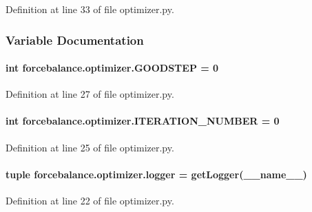 Definition at line 33 of file optimizer.\-py.



\subsubsection{Variable Documentation}
\hypertarget{namespaceforcebalance_1_1optimizer_a7b0cf561a0ec911ee4b217cb0b05a28e}{
\paragraph[{G\-O\-O\-D\-S\-T\-E\-P}]{\setlength{\rightskip}{0pt plus 5cm}int forcebalance.\-optimizer.\-G\-O\-O\-D\-S\-T\-E\-P = 0}}\label{namespaceforcebalance_1_1optimizer_a7b0cf561a0ec911ee4b217cb0b05a28e}


Definition at line 27 of file optimizer.\-py.

\hypertarget{namespaceforcebalance_1_1optimizer_ac3e728fa9f2dacdcca7e1b51d9f2a49e}{
\paragraph[{I\-T\-E\-R\-A\-T\-I\-O\-N\-\_\-\-N\-U\-M\-B\-E\-R}]{\setlength{\rightskip}{0pt plus 5cm}int forcebalance.\-optimizer.\-I\-T\-E\-R\-A\-T\-I\-O\-N\-\_\-\-N\-U\-M\-B\-E\-R = 0}}\label{namespaceforcebalance_1_1optimizer_ac3e728fa9f2dacdcca7e1b51d9f2a49e}


Definition at line 25 of file optimizer.\-py.

\hypertarget{namespaceforcebalance_1_1optimizer_a8c7d22696df2debf02ce9e3bb35349fd}{
\paragraph[{logger}]{\setlength{\rightskip}{0pt plus 5cm}tuple forcebalance.\-optimizer.\-logger = get\-Logger(\-\_\-\-\_\-name\-\_\-\-\_\-)}}\label{namespaceforcebalance_1_1optimizer_a8c7d22696df2debf02ce9e3bb35349fd}


Definition at line 22 of file optimizer.\-py.

